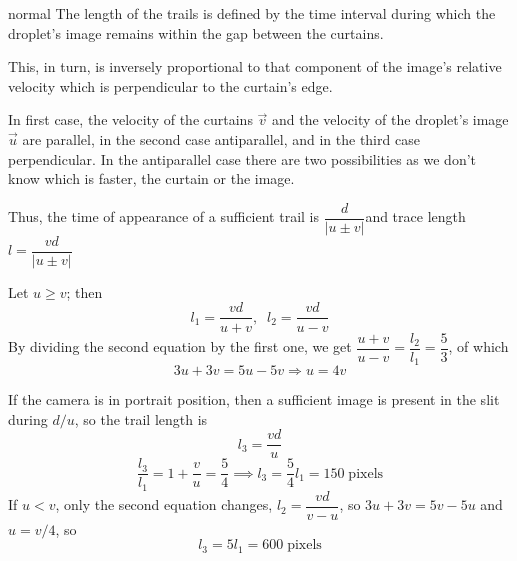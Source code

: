\begin{solution}{normal}
The length of the trails is defined by the time interval during which the droplet’s image remains within the gap between the curtains. \vspace{3mm}

This, in turn, is inversely proportional to that component of the image’s relative velocity which is perpendicular to the curtain’s edge. \vspace{3mm}

In first case, the velocity of the curtains $\vec{v}$ and the velocity of the droplet’s image $\vec{u}$ are parallel, in the second case antiparallel, and in the third case perpendicular. In the antiparallel case there are two possibilities as we don’t know which is faster, the curtain or the image. \vspace{3mm}

Thus, the time of appearance of a sufficient trail is $\dfrac{d}{|u\pm v|}$and trace length $l = \dfrac{vd}{|u\pm v|}$  \vspace{3mm}

Let $u \geq v$; then 
$$l_1 = \frac{vd}{u + v} ,\;\; l_2 = \frac{vd}{u - v}$$
By dividing the second equation by the first one, we get $ \dfrac{u + v}{u - v} = \dfrac{l_2}{l_1} = \dfrac{5}{3}$, of which $$3u+3v = 5u-5v \Rightarrow u = 4v $$

If the camera is in portrait position, then a sufficient image is present in the slit during $d/u$, so the trail length is
$$l_3 = \frac{vd}{u}$$
$$\frac{l_3}{l_1} = 1 + \frac{v}{u} = \frac{5}{4} \implies l_3 = \frac{5}{4}l_1 = \boxed{150\;\text{pixels}}$$
If $u <v$, only the second equation changes, $l_2 = \dfrac{vd}{v-u}$, so $3u+3v = 5v-5u$ and $u = v/4$, so 
$$l_3 = 5l_1 = \boxed{600\;\text{pixels}}$$
\end{solution}